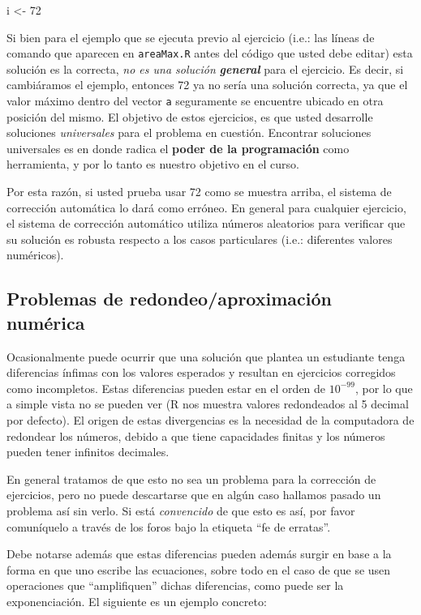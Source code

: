 \documentclass[]{article}
\newenvironment{Shaded}{}{}
\newcommand{\DecValTok}[1]{\textcolor[rgb]{0.25,0.63,0.44}{{#1}}}
\newcommand{\NormalTok}[1]{{#1}}
\begin{document}
\begin{Shaded}
\begin{Highlighting}[]
\NormalTok{i <- }\DecValTok{72}
\end{Highlighting}
\end{Shaded}
Si bien para el ejemplo que se ejecuta previo al ejercicio (i.e.: las
líneas de comando que aparecen en \texttt{areaMax.R} antes del código
que usted debe editar) esta solución es la correcta, \emph{no es una
solución} \emph{\textbf{general}} para el ejercicio. Es decir, si
cambiáramos el ejemplo, entonces 72 ya no sería una solución correcta,
ya que el valor máximo dentro del vector \texttt{a} seguramente se
encuentre ubicado en otra posición del mismo. El objetivo de estos
ejercicios, es que usted desarrolle soluciones \emph{universales} para
el problema en cuestión. Encontrar soluciones universales es en donde
radica el \textbf{poder de la programación} como herramienta, y por lo
tanto es nuestro objetivo en el curso.

Por esta razón, si usted prueba usar 72 como se muestra arriba, el
sistema de corrección automática lo dará como erróneo. En general para
cualquier ejercicio, el sistema de corrección automático utiliza números
aleatorios para verificar que su solución es robusta respecto a los
casos particulares (i.e.: diferentes valores numéricos).

\subsection{Problemas de redondeo/aproximación numérica}

Ocasionalmente puede ocurrir que una solución que plantea un estudiante
tenga diferencias ínfimas con los valores esperados y resultan en
ejercicios corregidos como incompletos. Estas diferencias pueden estar
en el orden de $10 ^ {-99}$, por lo que a simple vista no se pueden ver
(R nos muestra valores redondeados al 5 decimal por defecto). El origen
de estas divergencias es la necesidad de la computadora de redondear los
números, debido a que tiene capacidades finitas y los números pueden
tener infinitos decimales.

En general tratamos de que esto no sea un problema para la corrección de
ejercicios, pero no puede descartarse que en algún caso hallamos pasado
un problema así sin verlo. Si está \emph{convencido} de que esto es así,
por favor comuníquelo a través de los foros bajo la etiqueta ``fe de
erratas''.

Debe notarse además que estas diferencias pueden además surgir en base a
la forma en que uno escribe las ecuaciones, sobre todo en el caso de que
se usen operaciones que ``amplifiquen'' dichas diferencias, como puede
ser la exponenciación. El siguiente es un ejemplo concreto:
\end{document}
